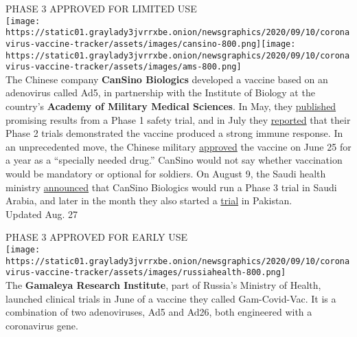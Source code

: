 PHASE 3 APPROVED FOR LIMITED USE\\
\texttt{[image: https://static01.graylady3jvrrxbe.onion/newsgraphics/2020/09/10/coronavirus-vaccine-tracker/assets/images/cansino-800.png]}\texttt{[image: https://static01.graylady3jvrrxbe.onion/newsgraphics/2020/09/10/coronavirus-vaccine-tracker/assets/images/ams-800.png]}\\
The Chinese company \textbf{\textbf{CanSino Biologics}} developed a
vaccine based on an adenovirus called Ad5, in partnership with the
Institute of Biology at the country's \textbf{\textbf{Academy of
Military Medical Sciences}}. In May, they
\href{https://www.nytimes3xbfgragh.onion/2020/05/22/health/coronavirus-vaccine-china.html}{published}
promising results from a Phase 1 safety trial, and in July they
\href{https://www.thelancet.com/lancet/article/s0140-6736(20)31605-6}{reported}
that their Phase 2 trials demonstrated the vaccine produced a strong
immune response. In an unprecedented move, the Chinese military
\href{https://www.nytimes3xbfgragh.onion/2020/07/16/business/china-vaccine-coronavirus.html}{approved}
the vaccine on June 25 for a year as a ``specially needed drug.''
CanSino would not say whether vaccination would be mandatory or optional
for soldiers. On August 9, the Saudi health ministry
\href{https://www.arabnews.com/node/1717041/saudi-arabia}{announced}
that CanSino Biologics would run a Phase 3 trial in Saudi Arabia, and
later in the month they also started a
\href{https://clinicaltrials.gov/ct2/show/NCT04526990?term=vaccine\&recrs=abdf\&cond=COVID-19\&phase=0123\&sort=nwst\&draw=2\&rank=1}{trial}
in Pakistan.\\
Updated Aug. 27

PHASE 3 APPROVED FOR EARLY USE\\
\texttt{[image: https://static01.graylady3jvrrxbe.onion/newsgraphics/2020/09/10/coronavirus-vaccine-tracker/assets/images/russiahealth-800.png]}\\
The \textbf{\textbf{Gamaleya Research Institute}}, part of Russia's
Ministry of Health, launched clinical trials in June of a vaccine they
called Gam-Covid-Vac. It is a combination of two adenoviruses, Ad5 and
Ad26, both engineered with a coronavirus gene.

